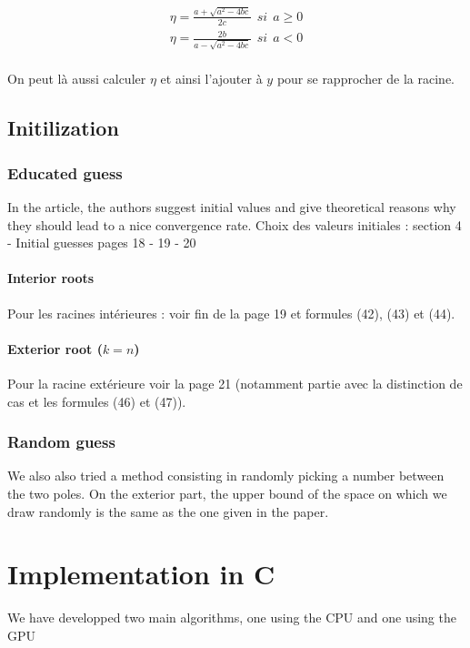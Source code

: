 \documentclass[10pt,a4paper]{article}
\begin{document}
\begin{eqnarray}\label{discri2}
\eta = \frac{a + \sqrt{a^2 - 4bc}}{2c}~~ si~~ a \geq 0 \\
\eta = \frac{2b}{a - \sqrt{a^2 - 4bc}}~~ si~~ a < 0
\end{eqnarray}

\paragraph{}
On peut là aussi calculer $\eta$ et ainsi l'ajouter à $y$ pour se rapprocher de la racine.


\subsection{Initilization}

\subsubsection{Educated guess}
In the article, the authors suggest initial values and give theoretical reasons why they should lead to a nice convergence rate.
Choix des valeurs initiales : section 4 - Initial guesses pages 18 - 19 - 20
\paragraph{Interior roots}
Pour les racines intérieures : voir fin de la page 19 et formules (42), (43) et (44).

\paragraph{Exterior root ($k=n$)}
Pour la racine extérieure voir la page 21 (notamment partie avec la distinction de cas et les formules (46) et (47)).

\subsubsection{Random guess}
We also also tried a method consisting in randomly picking a number between the two poles. On the exterior part, the upper bound of the space on which we draw randomly is the same as the one given in the paper.

\section{Implementation in C}
We have developped two main algorithms, one using the CPU and one using the GPU
\end{document}
